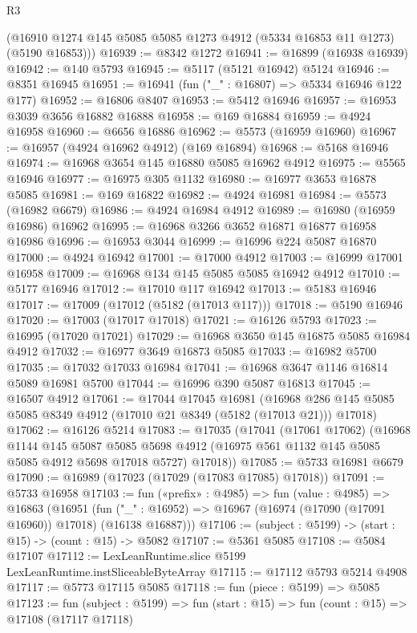 \begin{lexlean}{R3}
\begin{coremodule}
      (@16910 @1274 @145 @5085 @5085 @1273 @4912 (@5334 @16853 @11 @1273) (@5190 @16853)))
@16939 := @8342 @1272
@16941 := @16899 (@16938 @16939)
@16942 := @140 @5793
@16945 := @5117 (@5121 @16942) @5124
@16946 := @8351 @16945
@16951 := @16941 (fun ("_" : @16807) => @5334 @16946 @122 @177)
@16952 := @16806 @8407
@16953 := @5412 @16946
@16957 := @16953 @3039 @3656 @16882 @16888
@16958 := @169 @16884
@16959 := @4924 @16958
@16960 := @6656 @16886
@16962 := @5573 (@16959 @16960)
@16967 := @16957 (@4924 @16962 @4912) (@169 @16894)
@16968 := @5168 @16946
@16974 := @16968 @3654 @145 @16880 @5085 @16962 @4912
@16975 := @5565 @16946
@16977 := @16975 @305 @1132
@16980 := @16977 @3653 @16878 @5085
@16981 := @169 @16822
@16982 := @4924 @16981
@16984 := @5573 (@16982 @6679)
@16986 := @4924 @16984 @4912
@16989 := @16980 (@16959 @16986) @16962
@16995 := @16968 @3266 @3652 @16871 @16877 @16958 @16986
@16996 := @16953 @3044
@16999 := @16996 @224 @5087 @16870
@17000 := @4924 @16942
@17001 := @17000 @4912
@17003 := @16999 @17001 @16958
@17009 := @16968 @134 @145 @5085 @5085 @16942 @4912
@17010 := @5177 @16946
@17012 := @17010 @117 @16942
@17013 := @5183 @16946
@17017 := @17009 (@17012 (@5182 (@17013 @117)))
@17018 := @5190 @16946
@17020 := @17003 (@17017 @17018)
@17021 := @16126 @5793
@17023 := @16995 (@17020 @17021)
@17029 := @16968 @3650 @145 @16875 @5085 @16984 @4912
@17032 := @16977 @3649 @16873 @5085
@17033 := @16982 @5700
@17035 := @17032 @17033 @16984
@17041 := @16968 @3647 @1146 @16814 @5089 @16981 @5700
@17044 := @16996 @390 @5087 @16813
@17045 := @16507 @4912
@17061 := @17044
    @17045
    @16981
    (@16968 @286 @145 @5085 @5085 @8349 @4912 (@17010 @21 @8349 (@5182 (@17013 @21))) @17018)
@17062 := @16126 @5214
@17083 := @17035
    (@17041
      (@17061 @17062)
      (@16968
        @1144
        @145
        @5087
        @5085
        @5698
        @4912
        (@16975 @561 @1132 @145 @5085 @5085 @4912 @5698 @17018 @5727)
        @17018))
@17085 := @5733 @16981 @6679
@17090 := @16989 (@17023 (@17029 (@17083 @17085) @17018))
@17091 := @5733 @16958
@17103 := fun («prefix» : @4985) =>
  fun (value : @4985) =>
  @16863
    (@16951 (fun ("_" : @16952) => @16967 (@16974 (@17090 (@17091 @16960)) @17018) (@16138 @16887)))
@17106 := (subject : @5199) -> (start : @15) -> (count : @15) -> @5082
@17107 := @5361 @5085
@17108 := @5084 @17107
@17112 := LexLeanRuntime.slice @5199 LexLeanRuntime.instSliceableByteArray
@17115 := @17112 @5793 @5214 @4908
@17117 := @5773 @17115 @5085
@17118 := fun (piece : @5199) => @5085
@17123 := fun (subject : @5199) => fun (start : @15) => fun (count : @15) => @17108 (@17117 @17118)

\end{coremodule}
\end{lexlean}
